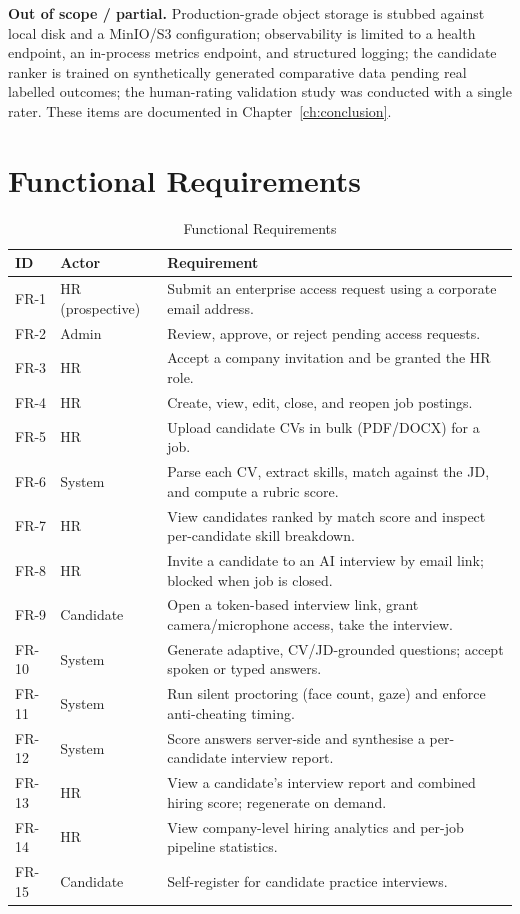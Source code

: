 \documentclass[12pt,a4paper,oneside]{report}
\begin{document}
\textbf{Out of scope / partial.} Production-grade object storage is stubbed against local disk
and a MinIO/S3 configuration; observability is limited to a health endpoint, an in-process
metrics endpoint, and structured logging; the candidate ranker is trained on synthetically
generated comparative data pending real labelled outcomes; the human-rating validation study
was conducted with a single rater. These items are documented in Chapter~\ref{ch:conclusion}.

\section{Functional Requirements}

\begin{table}[H]
\centering
\caption{Functional Requirements}
\label{tab:fr}
\begin{tabularx}{\textwidth}{C{1.2cm}C{2.2cm}X}
\toprule
\textbf{ID} & \textbf{Actor} & \textbf{Requirement} \\
\midrule
FR-1  & HR (prospective) & Submit an enterprise access request using a corporate email address. \\
FR-2  & Admin            & Review, approve, or reject pending access requests. \\
FR-3  & HR               & Accept a company invitation and be granted the HR role. \\
FR-4  & HR               & Create, view, edit, close, and reopen job postings. \\
FR-5  & HR               & Upload candidate CVs in bulk (PDF/DOCX) for a job. \\
FR-6  & System           & Parse each CV, extract skills, match against the JD, and compute a rubric score. \\
FR-7  & HR               & View candidates ranked by match score and inspect per-candidate skill breakdown. \\
FR-8  & HR               & Invite a candidate to an AI interview by email link; blocked when job is closed. \\
FR-9  & Candidate        & Open a token-based interview link, grant camera/microphone access, take the interview. \\
FR-10 & System           & Generate adaptive, CV/JD-grounded questions; accept spoken or typed answers. \\
FR-11 & System           & Run silent proctoring (face count, gaze) and enforce anti-cheating timing. \\
FR-12 & System           & Score answers server-side and synthesise a per-candidate interview report. \\
FR-13 & HR               & View a candidate's interview report and combined hiring score; regenerate on demand. \\
FR-14 & HR               & View company-level hiring analytics and per-job pipeline statistics. \\
FR-15 & Candidate        & Self-register for candidate practice interviews. \\
\bottomrule
\end{tabularx}
\end{table}
\end{document}
